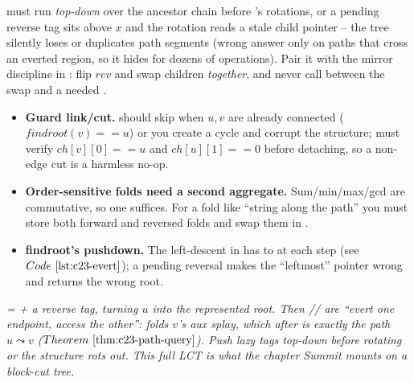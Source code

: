 \begin{warningbox}
 must run \emph{top-down} over the ancestor chain before
's rotations, or a pending reverse tag sits above \(x\) and the
rotation reads a stale child pointer -- the tree silently loses or duplicates path
segments (wrong answer only on paths that cross an everted region, so it hides for
dozens of operations). Pair it with the mirror discipline in : flip
\(\mathit{rev}\) and swap children \emph{together}, and never call 
between the swap and a needed .
\end{warningbox}

\begin{hardeningbox}
\begin{itemize}[nosep,leftmargin=1.4em]
  \item \textbf{Guard link/cut.}  should skip when \(u,v\) are already
        connected (\(\mathit{findroot}(v)==u\)) or you create a cycle and corrupt the
        structure;  must verify \(\mathit{ch}[v][0]==u\) and \(\mathit{ch}[u][1]==0\)
        before detaching, so a non-edge cut is a harmless no-op.
  \item \textbf{Order-sensitive folds need a second aggregate.} Sum/min/max/gcd are
        commutative, so one  suffices. For a fold like
        ``string along the path'' you must store both forward and reversed folds and
        swap them in .
  \item \textbf{findroot's pushdown.} The left-descent in  has to
         at each step (see \(\coderef{c23-evert}\)); a pending reversal
        makes the ``leftmost'' pointer wrong and returns the wrong root.
\end{itemize}
\end{hardeningbox}

\begin{recallbox}
\emph{ =  + a reverse tag, turning \(u\) into the
represented root. Then // are ``evert one endpoint,
access the other'':  folds \(v\)'s aux splay, which after
 is exactly the path \(u\leadsto v\)
(\(\thmref{c23-path-query}\)). Push lazy tags top-down before rotating or the structure
rots out. This full LCT is what the chapter Summit mounts on a block-cut tree.}
\end{recallbox}
